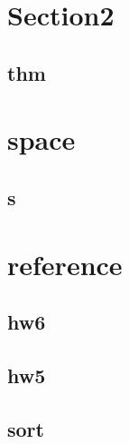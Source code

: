 \section{Section2}
    \subsection{thm}
        

\section{space}
    \subsection{s}
        
    

\section{reference}
    \subsection{hw6}
        
    \subsection{hw5}
        
    \subsection{sort}
        